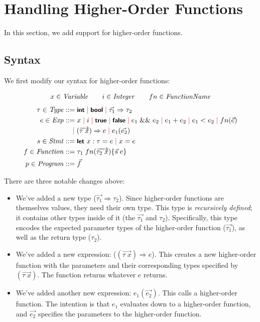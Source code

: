 \section{Handling Higher-Order Functions}
In this section, we add support for higher-order functions.

\subsection{Syntax}
We first modify our syntax for higher-order functions:

\begin{gather*}
  x \in \mathit{Variable} \qquad i \in \mathit{Integer} \qquad fn \in \mathit{FunctionName}
\end{gather*}
\begin{align*}
  \tau \in \mathit{Type} &::= \mbox{\sffamily{\bfseries\small {int}}} \; {\color{red}\mid}\; \mbox{\sffamily{\bfseries\small {bool}}} \; {\color{red}\mid}\; \vec{\tau_1} \Rightarrow \tau_2\\
  e \in \mathit{Exp} &::= x \; {\color{red}\mid}\; i \; {\color{red}\mid}\; \mbox{\sffamily{\bfseries\small {true}}} \; {\color{red}\mid}\; \mbox{\sffamily{\bfseries\small {false}}} \; {\color{red}\mid}\; e_1 \;\&\&\; e_2 \; {\color{red}\mid}\; e_1 + e_2 \; {\color{red}\mid}\; e_1 < e_2 \; {\color{red}\mid}\; fn(\vec{e})\\
  &\ \ \ \; {\color{red}\mid}\; (\overrightarrow{\tau\;x}) \Rightarrow e \; {\color{red}\mid}\; e_1(\vec{e_2})\\
  s \in \mathit{Stmt} &::= \mbox{\sffamily{\bfseries\small {let }}} x: \tau = e \; {\color{red}\mid}\; x = e\\
  f \in \mathit{Function} &::= \tau_1\;fn(\overrightarrow{\tau_2\;x}) \{ \vec{s}\;e \}\\
  p \in \mathit{Program} &::= \vec{f}
\end{align*}

\noindent
There are three notable changes above:
\begin{itemize}
\item We've added a new type ($\vec{\tau_1} \Rightarrow \tau_2$).
  Since higher-order functions are themselves values, they need their own type.
  This type is \emph{recursively defined}; it contains other types inside of it (the $\vec{\tau_1}$ and $\tau_2$).
  Specifically, this type encodes the expected parameter types of the higher-order function ($\vec{\tau_1}$), as well as the return type ($\tau_2$).
\item We've added a new expression: ($(\overrightarrow{\tau\;x}) \Rightarrow e$).
  This creates a new higher-order function with the parameters and their corresponding types specified by $(\overrightarrow{\tau\;x})$.
  The function returns whatever $e$ returns.
\item We've added another new expression: $e_1(\vec{e_2})$.
  This calls a higher-order function.
  The intention is that $e_1$ evaluates down to a higher-order function, and $\vec{e_2}$ specifies the parameters to the higher-order function.
\end{itemize}

